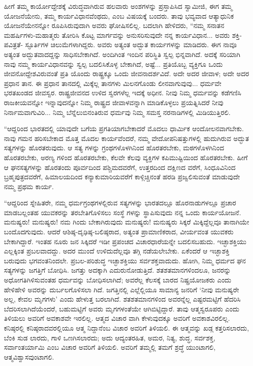 ಹೀಗೆ ತಮ್ಮ ಕಾರ್ಯೋದ್ದೇಶಕ್ಕೆ ವಿರುದ್ಧವಾಗಿರುವ ಹಲವಾರು ಅಂಶಗಳನ್ನು ಪ್ರಸ್ತಾಪಿಸಿದ ಸ್ವಾಮೀಜಿ, ಈಗ ತಮ್ಮ ಯೋಜನೆಯೇನು, ತಮ್ಮ ಕಾರ್ಯವಿಧಾನವೆಂಥದು, ಎಂಬ ವಿಷಯಕ್ಕೆ ಬಂದರು. ತಾವು ಭವ್ಯವಾದ ಆತ್ಯಾಧುನಿಕ ಯೋಜನೆಯೇನನ್ನೋ ರೂಪಿಸಿರುವುದಾಗಿ ಅವರು ಘೋಷಿಸಲಿಲ್ಲ. ಬದಲಾಗಿ ಹೇಳಿದರು, “ನಮ್ಮ ಸನಾತನ ಮಹರ್ಷಿಗಳು-ಮಹಾತ್ಮರು ತೋರಿಸಿ ಕೊಟ್ಟ ಮಾರ್ಗವನ್ನು ಅನುಸರಿಸುವುದೇ ನನ್ನ ಕಾರ್ಯವಿಧಾನ... ಅವರು ಶಕ್ತಿ-ಪವಿತ್ರತೆ- ಸ್ಫೂರ್ತಿಗಳ ಚಿಲುಮೆಗಳಾಗಿದ್ದರು. ಅವರು ಅತ್ಯಂತ ಅದ್ಭುತ ಕಾರ್ಯಗಳನ್ನು ಮಾಡಿದರು. ಈಗ ನಾವೂ ಅತ್ಯಂತ ಅದ್ಭುತವಾದದ್ದನ್ನು ಸಾಧಿಸಬೇಕಾಗಿದೆ. ಅಂದಿಗಿಂತ ಇಂದಿನ ಪರಿಸ್ಥಿತಿ ಸ್ವಲ್ಪ ಭಿನ್ನವಾಗಿದೆ. ಅದಕ್ಕೆ ಸರಿಯಾಗಿ ನಾವು ನಮ್ಮ ಕಾರ್ಯವಿಧಾನವನ್ನು ಸ್ವಲ್ಪ ಬದಲಿಸಿಕೊಳ್ಳ ಬೇಕಾಗಿದೆ, ಅಷ್ಟೆ... ಪ್ರತಿಯೊಬ್ಬ ವ್ಯಕ್ತಿಗೂ ಒಂದು ಜೀವನೋದ್ದೇಶವಿರುವಂತೆ ಪ್ರತಿ ಯೊಂದು ರಾಷ್ಟ್ರಕ್ಕೂ ಒಂದು ಜೀವನಾದರ್ಶವಿದೆ. ಅದೇ ಅದರ ಜೀವಾಳ; ಅದೇ ಅದರ ಪ್ರಧಾನ ತಾನ. ಈ ಪ್ರಧಾನ ತಾನದಲ್ಲಿ ಮಿಕ್ಕೆಲ್ಲ ತಾನಗಳು ಮಿಲನಗೊಂಡು ಲೀನವಾಗುವುವು... ಧರ್ಮವೇ ಭರತಖಂಡದ ಜೀವಸ್ವರ. ರಾಷ್ಟ್ರಜೀವನದ ಉಳಿದ ಸ್ವರಗಳೆಲ್ಲ ಇದಕ್ಕೆ ಅಧೀನ. ನೀವು ನಿಮ್ಮ ಧರ್ಮವನ್ನು ಕಡೆಗಣಿಸಿ ರಾಜಕೀಯವನ್ನೋ ಇನ್ನಾವುದನ್ನೋ ನಿಮ್ಮ ರಾಷ್ಟ್ರದ ಜೀವಾಳವನ್ನಾಗಿ ಮಾಡಿಕೊಳ್ಳಲು ಪ್ರಯತ್ನಿಸಿದರೆ ನೀವು ನಿರ್ನಾಮವಾಗುವಿರಿ... ನಿಮ್ಮ ಬೆನ್ನೆಲುಬಿನಂತಿರುವ ಧರ್ಮವು ನಿಮ್ಮ ಸಮಸ್ತ ನರನಾಡಿಗಳಲ್ಲಿ ಮಿಡಿಯುತ್ತಿರಲಿ.

“ಆದ್ದರಿಂದ ಭಾರತದಲ್ಲಿ ಯಾವುದೇ ಬಗೆಯ ಪ್ರಗತಿಯಾಗಬೇಕಾದರೆ ಮೊದಲು ಧಾರ್ಮಿಕ ಆಂದೋಲನವಾಗಬೇಕು. ನಾವು ಗಮನ ಹರಿಸಬೇಕಾದ ಮೊತ್ತ ಮೊದಲ ಕಾರ್ಯವೆಂದರೆ, ನಮ್ಮ ವೇದೋಪನಿಷತ್ತುಗಳಲ್ಲಿ ಹುದುಗಿರುವ ಅದ್ಭುತ ಸತ್ಯಗಳನ್ನು ಹೊರತರುವುದು. ಆ ಸತ್ಯ ಗಳನ್ನು ಗ್ರಂಥಗಳೊಳಗಿನಿಂದ ಹೊರತರಬೇಕು, ಮಠಗಳೊಳಗಿನಿಂದ ಹೊರತರಬೇಕು, ಅರಣ್ಯ ಗಳಿಂದ ಹೊರತರಬೇಕು, ಕೆಲವೇ ಕೆಲವು ವ್ಯಕ್ತಿಗಳ ಕಪಿಮುಷ್ಟಿಯಿಂದ ಹೊರತರಬೇಕು. ಹೀಗೆ ಆ ಘನಸತ್ಯಗಳನ್ನು ಹೊರತಂದು ಪೂರ್ವದಿಂದ ಪಶ್ಚಿಮದವರೆಗೆ, ಉತ್ತರದಿಂದ ದಕ್ಷಿಣದ ವರೆಗೆ, ಸಿಂಧೂವಿನಿಂದ ಬ್ರಹ್ಮಪುತ್ರದವರೆಗೆ, ಹಿಮಾಲಯದಿಂದ ಕನ್ಯಾಕುಮಾರಿಯವರೆಗೆ ಕಾಳ್ಗಿಚ್ಚಿನಂತೆ ಹರಡಿ ಪ್ರಜ್ವಲಿಸುವಂತೆ ಮಾಡುವುದೇ ನಮ್ಮ ಪ್ರಥಮ ಕಾರ್ಯ.

“ಆದ್ದರಿಂದ ಸ್ನೇಹಿತರೇ, ನಮ್ಮ ಧರ್ಮಗ್ರಂಥಗಳಲ್ಲಿರುವ ಸತ್ಯಗಳನ್ನು ಭಾರತದಲ್ಲೂ ಹೊರನಾಡುಗಳಲ್ಲೂ ಪ್ರಚಾರ ಮಾಡಬಲ್ಲಂತಹ ಯುವಕರನ್ನು ತರಬೇತಿಗೊಳಿಸಲು ಸಂಸ್ಥೆ ಗಳನ್ನು ಸ್ಥಾಪಿಸುವುದು ನನ್ನ ಒಂದು ಕಾರ್ಯಯೋಜನೆ. ಮನುಷ್ಯರು! ಮನುಷ್ಯರು! ನಮ ಗಿಂದು ಬೇಕಾಗಿರುವುದು ಮನುಷ್ಯರು! ಮನುಷ್ಯರು ಸಿಕ್ಕರೆ ಮಿಕ್ಕಿದ್ದೆಲ್ಲವೂ ತಾನಾಗಿಯೇ ಬಂದೊದಗುವುದು. ಆದರೆ ಆಶಿಷ್ಠ-ದೃಢಿಷ್ಠ-ಬಲಿಷ್ಠರಾದ, ಅತ್ಯಂತ ಪ್ರಾಮಾಣಿಕರಾದ, ವೀರ್ಯವಂತ ಯುವಕರು ಬೇಕಾಗಿದ್ದಾರೆ. ಇಂತಹ ನೂರು ಜನ ಸಿಕ್ಕಿದರೆ ಇಡೀ ಪ್ರಪಂಚದ ವಿಚಾರಧಾರೆಯನ್ನೇ ಬದಲಿಸಬಹುದು. ಇಚ್ಛಾಶಕ್ತಿಯು ಎಲ್ಲಕ್ಕಿಂತ ಪ್ರಬಲವಾದದ್ದು. ಅದರ ಮುಂದೆ ಉಳಿದುದೆಲ್ಲವೂ ತಗ್ಗಿ ನಡೆಯಲೇಬೇಕು. ಏಕೆಂದರೆ ಆ ಇಚ್ಛಾಶಕ್ತಿ ಬರುವುದು ಭಗವಂತನಿಂದಲೇ. ಪ್ರಬಲ-ಪರಿಶುದ್ಧ ಇಚ್ಛಾಶಕ್ತಿಯು ಸರ್ವಶಕ್ತವಾದುದು. ಹೋಗಿ, ನಿಮ್ಮ ಧರ್ಮದ ಘನ ಸತ್ಯಗಳನ್ನು ಜಗತ್ತಿಗೆ ಬೋಧಿಸಿ. ಜಗತ್ತು ಅದಕ್ಕಾಗಿ ಎದುರುನೋಡುತ್ತಿದೆ. ಶತಶತಮಾನಗಳಿಂದಲೂ, ಜನರನ್ನು ಅಧೋಗತಿಗಿಳಿಸುವಂತಹ ಧರ್ಮವನ್ನು ಬೋಧಿಸಲಾಗಿದೆ; ಅವರೆಲ್ಲ ಕೆಲಸಕ್ಕೆ ಬಾರದ ನಿಷ್ಪ್ರಯೋಜಕರು ಎಂದು ಹೇಳಿಹೇಳಿ ಅವರನ್ನು ದುರ್ಬಲಗೊಳಿಸಲಾ ಗಿದೆ. ಜಗತ್ತಿನಲ್ಲಿ ಎಲ್ಲೆಲ್ಲಿಯೂ ಸಾಮಾನ್ಯ ಜನರಿಗೆ ‘ನೀವು ಮನುಷ್ಯರೇ ಅಲ್ಲ, ಕೇವಲ ಮೃಗಗಳು’ ಎಂದು ಹೇಳುತ್ತ ಬರಲಾಗಿದೆ. ಶತಶತಮಾನಗಳಿಂದ ಅವರನ್ನೆಲ್ಲ ಎಷ್ಟರಮಟ್ಟಿಗೆ ಹೆದರಿಸಿ ಬೆದರಿಸಲಾಗಿದೆಯೆಂದರೆ, ಬಹುಮಟ್ಟಿಗೆ ಅವರು ಮೃಗಗಳಂತೆಯೇ ಆಗಿಬಿಟ್ಟಿದ್ದಾರೆ. ತಾವು ಆತ್ಮಸ್ವರೂಪರು ಎಂದು ತಿಳಿಯಲು ಅವರಿಗೆ ಅವಕಾಶವೇ ಇರಲಿಲ್ಲ. ಆತ್ಮದ ವಿಚಾರ ವಾಗಿ ಕೇಳುವುದಕ್ಕೂ ಅವರಿಗೆ ಅವಕಾಶವಿರಲಿಲ್ಲ. ಕನಿಷ್ಠರಲ್ಲಿ ಕನಿಷ್ಠರಾದವರಲ್ಲಿಯೂ ಆತ್ಮ ನಿದ್ದಾನೆಂಬ ವಿಚಾರ ಅವರಿಗೆ ತಿಳಿಯಲಿ. ಈ ಆತ್ಮವನ್ನು ಖಡ್ಗ ಕತ್ತರಿಸಲಾರದು, ಬೆಂಕಿ ಸುಡ ಲಾರದು, ಗಾಳಿ ಒಣಗಿಸಲಾರದು; ಅದು ಆದ್ಯಂತರಹಿತ, ಅಮರ, ನಿತ್ಯ, ಶುದ್ಧ, ಸರ್ವಶಕ್ತ, ಸರ್ವಾಂತರ್ಯಾಮಿ ಎಂಬ ವಿಚಾರ ಅವರಿಗೆ ತಿಳಿಯಲಿ. ಅವರಿಗೆ ತಮ್ಮಲ್ಲಿ ತಮಗೆ ಶ್ರದ್ಧೆ ಯುಂಟಾಗಲಿ, ಆತ್ಮವಿಶ್ವಾಸವುಂಟಾಗಲಿ.

